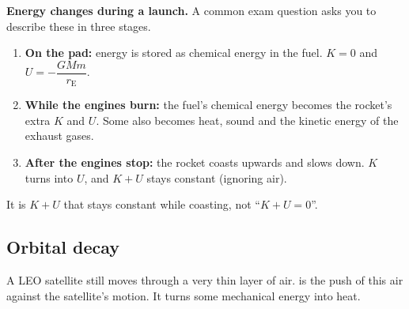 \textbf{Energy changes during a launch.} A common exam question asks you to
describe these in three stages.
\begin{enumerate}
  \item \textbf{On the pad:} energy is stored as chemical energy in the fuel.
        $K = 0$ and $U = -\dfrac{GMm}{r_\mathrm{E}}$.
  \item \textbf{While the engines burn:} the fuel's chemical energy becomes the
        rocket's extra $K$ and $U$. Some also becomes heat, sound and the kinetic
        energy of the exhaust gases.
  \item \textbf{After the engines stop:} the rocket coasts upwards and slows
        down. $K$ turns into $U$, and $K + U$ stays constant (ignoring air).
\end{enumerate}
It is $K + U$ that stays constant while coasting, not ``$K + U = 0$''.

\subsection{Orbital decay}

A LEO satellite still moves through a very thin layer of air.  is the push of this air against the satellite's motion. It turns some
mechanical energy into heat.

